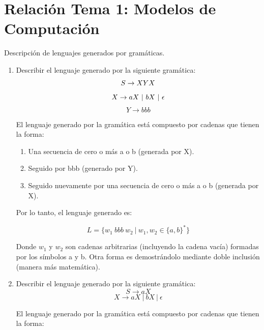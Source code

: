 \documentclass[12pt]{report} %
\begin{document}
\hypertarget{relaciuxf3n-tema-1-modelos-de-computaciuxf3n}{%
\section{Relación Tema 1: Modelos de
Computación}\label{relaciuxf3n-tema-1-modelos-de-computaciuxf3n}}

\begin{ejercicio}
Descripción de lenguajes generados por gramáticas.
\end{ejercicio}

\begin{enumerate}
\def\labelenumi{\alph{enumi})}
\item
  Describir el lenguaje generado por la siguiente gramática: \[
   S \to XYX \\
   \] \[
   X \to aX \ | \ bX \ | \ \epsilon \\
   \] \[
   Y \to bbb
   \]

  \begin{solucion}[Ejercicio 1.a]

   El lenguaje generado por la gramática está compuesto por cadenas que tienen la forma:

   \begin{enumerate}
       \item Una secuencia de cero o más a o b (generada por X).
       \item Seguido por bbb (generado por Y).
       \item Seguido nuevamente por una secuencia de cero o más a o b (generada por X).
   \end{enumerate}

   Por lo tanto, el lenguaje generado es:

   $$
   L = \{ w_1 \ bbb \ w_2 \ | \ w_1, w_2 \in \{a, b\}^* \}
   $$

   Donde $w_1$ y $w_2$ son cadenas arbitrarias (incluyendo la cadena vacía) formadas por los símbolos a y b. Otra forma es demostrándolo mediante doble inclusión (manera más matemática).

   \end{solucion}
\item
  Describir el lenguaje generado por la siguiente gramática: \[
   S \to aX 
   \] \[
   X \to aX \ | \ bX \ | \ \epsilon
   \]

  \begin{solucion}[Ejercicio 1.b]

   El lenguaje generado por la gramática está compuesto por cadenas que tienen la forma:


\end{solucion}
\end{enumerate}
\end{document}
